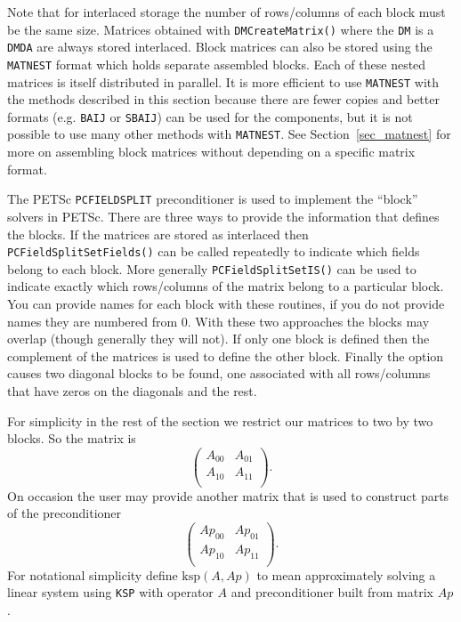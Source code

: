 Note that for interlaced storage the number of rows/columns of each
block must be the same size. Matrices obtained with \lstinline{DMCreateMatrix()}
where the \lstinline{DM} is a \lstinline{DMDA} are always stored interlaced.
Block matrices can also be stored using the \lstinline{MATNEST} format which holds separate assembled blocks.
Each of these nested matrices is itself distributed in parallel.
It is more efficient to use \lstinline{MATNEST} with the methods described in this section because there are fewer copies and better formats (e.g. \lstinline{BAIJ} or \lstinline{SBAIJ}) can be used for the components, but it is not possible to use many other methods with \lstinline{MATNEST}.
See Section~\ref{sec_matnest} for more on assembling block matrices without depending on a specific matrix format.

The PETSc \lstinline{PCFIELDSPLIT} preconditioner is used to implement the
``block'' solvers in PETSc. There are three ways to provide the
information that defines the blocks.  If the matrices are stored as
interlaced then \lstinline{PCFieldSplitSetFields()} can be called repeatedly to
indicate which fields belong to each block. More generally
\lstinline{PCFieldSplitSetIS()} can be used to indicate exactly which rows/columns
of the matrix belong to a particular block. You can provide names for each block with these routines, if you do not provide
names they are numbered from 0. With these two approaches
the blocks may overlap (though generally they will not). If only one
block is defined then the complement of the matrices is used to define
the other block. Finally the
option 
 causes two diagonal blocks to be found, one associated with all
rows/columns that have zeros on the diagonals and the rest.

For simplicity in the rest of the section we restrict our matrices to two by two blocks. So the matrix is
\[
\left( \begin{array}{cc}
A_{00}   & A_{01} \\
A_{10}   & A_{11} \\
\end{array} \right).
\]
On occasion the user may provide another matrix that is used to construct parts of the preconditioner
\[
\left( \begin{array}{cc}
Ap_{00}   & Ap_{01} \\
Ap_{10}   & Ap_{11} \\
\end{array} \right).
\]
For notational simplicity define $\text{ksp}(A,Ap) $ to mean approximately solving a linear system using \lstinline{KSP} with operator $ A$ and
preconditioner built from matrix $Ap$.

